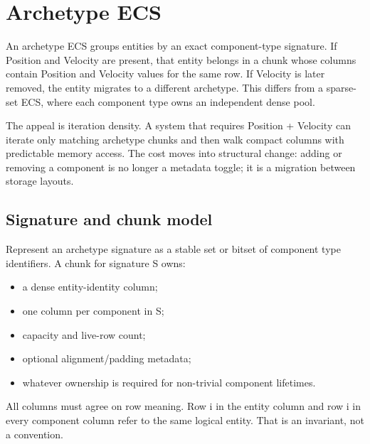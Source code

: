 \hypertarget{appendix-fbfeb0430008}{}\label{referencestart:appendix-fbfeb0430008}
\section{Archetype ECS}\label{appendix-fbfeb0430008-archetype-ecs}

\hypertarget{appendix-fbfeb0430008-archetype-ecs}{}

An archetype ECS groups entities by an exact component-type signature. If Position and Velocity are present, that entity belongs in a chunk whose columns contain Position and Velocity values for the same row. If Velocity is later removed, the entity migrates to a different archetype. This differs from a sparse-set ECS, where each component type owns an independent dense pool.

The appeal is iteration density. A system that requires Position + Velocity can iterate only matching archetype chunks and then walk compact columns with predictable memory access. The cost moves into structural change: adding or removing a component is no longer a metadata toggle; it is a migration between storage layouts.

\subsection{Signature and chunk model}\label{appendix-fbfeb0430008-signature-and-chunk-model}

\hypertarget{appendix-fbfeb0430008-signature-and-chunk-model}{}

Represent an archetype signature as a stable set or bitset of component type identifiers. A chunk for signature S owns:

\begin{itemize}
\tightlist
\item
  a dense entity-identity column;
\item
  one column per component in S;
\item
  capacity and live-row count;
\item
  optional alignment/padding metadata;
\item
  whatever ownership is required for non-trivial component lifetimes.
\end{itemize}

All columns must agree on row meaning. Row i in the entity column and row i in every component column refer to the same logical entity. That is an invariant, not a convention.

